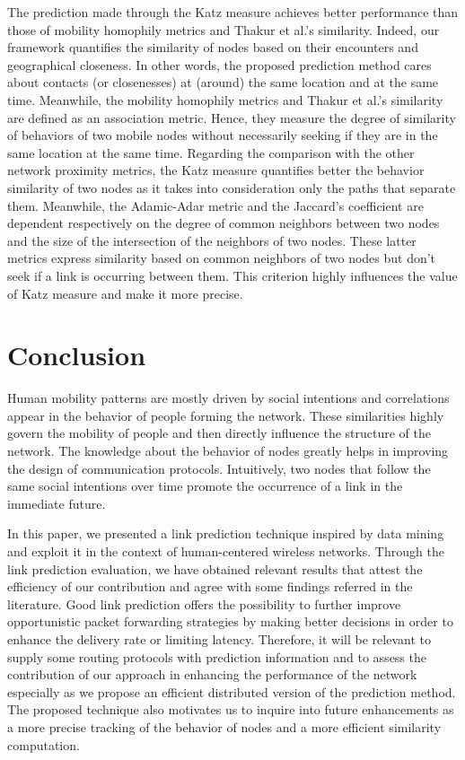 \documentclass[conference]{IEEEtran}
\begin{document}
The prediction made through the Katz measure achieves better
performance than those of mobility homophily metrics and Thakur et
al.'s similarity. Indeed, our framework quantifies the similarity of
nodes based on their encounters and geographical closeness. In other
words, the proposed prediction method cares about contacts (or
closenesses) at (around) the same location and at the same time.
Meanwhile, the mobility homophily metrics and Thakur et al.'s
similarity are defined as an association metric. Hence, they measure
the degree of similarity of behaviors of two mobile nodes without
necessarily seeking if they are in the same location at the same
time. Regarding the comparison with the other network proximity
metrics, the Katz measure quantifies better the behavior similarity
of two nodes as it takes into consideration only the paths that
separate them. Meanwhile, the Adamic-Adar metric and the Jaccard's
coefficient are dependent respectively on the degree of common
neighbors between two nodes and the size of the intersection of the
neighbors of two nodes. These latter metrics express similarity
based on common neighbors of two nodes but don't seek if a link is
occurring between them. This criterion highly influences the value
of Katz measure and make it more precise.

\section{Conclusion}
Human mobility patterns are mostly driven by social intentions and
correlations appear in the behavior of people forming the network.
These similarities highly govern the mobility of people and then
directly influence the structure of the network. The knowledge about
the behavior of nodes greatly helps in improving the design of
communication protocols. Intuitively, two nodes that follow the same
social intentions over time promote the occurrence of a link in the
immediate future.

In this paper, we presented a link prediction technique inspired by
data mining and exploit it in the context of human-centered wireless
networks. Through the link prediction evaluation, we have obtained
relevant results that attest the efficiency of our contribution and
agree
with some findings referred in the literature. 
Good link prediction offers the possibility to further improve
opportunistic packet forwarding strategies by making better
decisions in order to enhance the delivery rate or limiting latency.
Therefore, it will be relevant to supply some routing protocols with
prediction information and to assess the contribution of our
approach in enhancing the performance of the network especially as
we propose an efficient distributed version of the prediction
method. The proposed technique also motivates us to inquire into
future enhancements as a more precise tracking of the behavior of
nodes and a more efficient similarity computation.




\end{document}

